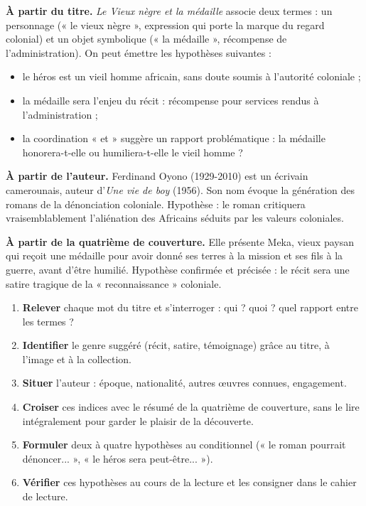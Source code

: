 \documentclass[11pt]{article}
\begin{document}
\textbf{À partir du titre.} \emph{Le Vieux nègre et la médaille} associe deux termes : un personnage (« le vieux nègre », expression qui porte la marque du regard colonial) et un objet symbolique (« la médaille », récompense de l'administration). On peut émettre les hypothèses suivantes :
\begin{itemize}
\item le héros est un vieil homme africain, sans doute soumis à l'autorité coloniale ;
\item la médaille sera l'enjeu du récit : récompense pour services rendus à l'administration ;
\item la coordination « et » suggère un rapport problématique : la médaille honorera-t-elle ou humiliera-t-elle le vieil homme ?
\end{itemize}

\textbf{À partir de l'auteur.} Ferdinand Oyono (1929-2010) est un écrivain camerounais, auteur d'\emph{Une vie de boy} (1956). Son nom évoque la génération des romans de la dénonciation coloniale. Hypothèse : le roman critiquera vraisemblablement l'aliénation des Africains séduits par les valeurs coloniales.

\textbf{À partir de la quatrième de couverture.} Elle présente Meka, vieux paysan qui reçoit une médaille pour avoir donné ses terres à la mission et ses fils à la guerre, avant d'être humilié. Hypothèse confirmée et précisée : le récit sera une satire tragique de la « reconnaissance » coloniale.

\begin{methode}
\begin{enumerate}
\item \textbf{Relever} chaque mot du titre et s'interroger : qui ? quoi ? quel rapport entre les termes ?
\item \textbf{Identifier} le genre suggéré (récit, satire, témoignage) grâce au titre, à l'image et à la collection.
\item \textbf{Situer} l'auteur : époque, nationalité, autres œuvres connues, engagement.
\item \textbf{Croiser} ces indices avec le résumé de la quatrième de couverture, sans le lire intégralement pour garder le plaisir de la découverte.
\item \textbf{Formuler} deux à quatre hypothèses au conditionnel (« le roman pourrait dénoncer... », « le héros sera peut-être... »).
\item \textbf{Vérifier} ces hypothèses au cours de la lecture et les consigner dans le cahier de lecture.
\end{enumerate}
\end{methode}
\end{document}
